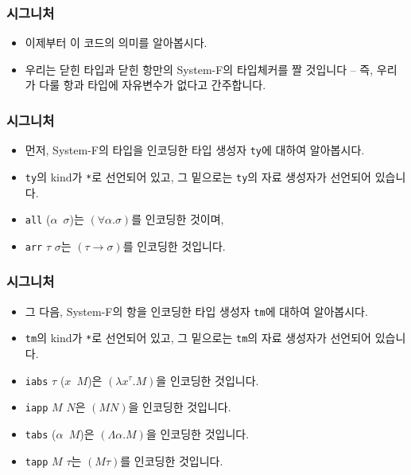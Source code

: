 \documentclass[slidestop,compress,mathserif]{beamer}
\begin{document}
    \begin{frame}
        \frametitle{시그니처}
        \begin{itemize}
            \item 이제부터 이 코드의 의미를 알아봅시다.
            \item 우리는 닫힌 타입과 닫힌 항만의 System-F의 타입체커를 짤 것입니다 -- 즉, 우리가 다룰 항과 타입에 자유변수가 없다고 간주합니다.
        \end{itemize}
    \end{frame}

    \begin{frame}
        \frametitle{시그니처}
        \begin{itemize}
            \item 먼저, System-F의 타입을 인코딩한 타입 생성자 \texttt{ty}에 대하여 알아봅시다.
            \item \texttt{ty}의 kind가 \texttt{*}로 선언되어 있고, 그 밑으로는 \texttt{ty}의 자료 생성자가 선언되어 있습니다.
            \item \texttt{all} ($\alpha$\texttt{\string\ }$\sigma$)는 $\left( \forall \alpha . \sigma \right)$를 인코딩한 것이며,
            \item \texttt{arr} $\tau$ $\sigma$는 $\left( \tau \to \sigma \right)$를 인코딩한 것입니다.
        \end{itemize}
    \end{frame}

    \begin{frame}
        \frametitle{시그니처}
        \begin{itemize}
            \item 그 다음, System-F의 항을 인코딩한 타입 생성자 \texttt{tm}에 대하여 알아봅시다.
            \item \texttt{tm}의 kind가 \texttt{*}로 선언되어 있고, 그 밑으로는 \texttt{tm}의 자료 생성자가 선언되어 있습니다.
            \item \texttt{iabs} $\tau$ ($x$\texttt{\string\ }$M$)은 $\left( \lambda x^{\tau} . M \right)$을 인코딩한 것입니다.
            \item \texttt{iapp} $M$ $N$은 $\left( M N \right)$을 인코딩한 것입니다.
            \item \texttt{tabs} ($\alpha$\texttt{\string\ }$M$)은 $\left( \Lambda \alpha . M \right)$을 인코딩한 것입니다.
            \item \texttt{tapp} $M$ $\tau$는 $\left( M \tau \right)$를 인코딩한 것입니다.
        \end{itemize}
    \end{frame}
\end{document}

